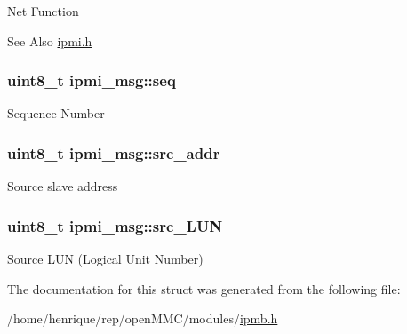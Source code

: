 Net Function \begin{DoxySeeAlso}{See Also}
\hyperlink{ipmi_8h}{ipmi.\-h} 
\end{DoxySeeAlso}
\hypertarget{structipmi__msg_a5a0a03acb296bfb8fcaa13af34d6753d}{
\subsubsection[{seq}]{\setlength{\rightskip}{0pt plus 5cm}uint8\-\_\-t ipmi\-\_\-msg\-::seq}}\label{structipmi__msg_a5a0a03acb296bfb8fcaa13af34d6753d}
Sequence Number \hypertarget{structipmi__msg_a1d76593e504bafe00e55dacbe5ac719b}{
\subsubsection[{src\-\_\-addr}]{\setlength{\rightskip}{0pt plus 5cm}uint8\-\_\-t ipmi\-\_\-msg\-::src\-\_\-addr}}\label{structipmi__msg_a1d76593e504bafe00e55dacbe5ac719b}
Source slave address \hypertarget{structipmi__msg_af532820e2b3f8a729c4546bd7af7a2c0}{
\subsubsection[{src\-\_\-\-L\-U\-N}]{\setlength{\rightskip}{0pt plus 5cm}uint8\-\_\-t ipmi\-\_\-msg\-::src\-\_\-\-L\-U\-N}}\label{structipmi__msg_af532820e2b3f8a729c4546bd7af7a2c0}
Source L\-U\-N (Logical Unit Number) 

The documentation for this struct was generated from the following file\-:\begin{DoxyCompactItemize}
\item 
/home/henrique/rep/open\-M\-M\-C/modules/\hyperlink{ipmb_8h}{ipmb.\-h}\end{DoxyCompactItemize}
